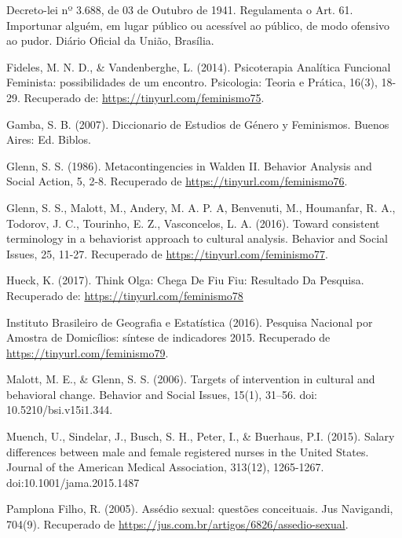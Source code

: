 \hangindent=25pt
\noindent Decreto-lei nº 3.688, de 03 de Outubro de 1941. Regulamenta o Art. 61. Importunar alguém, em lugar público ou acessível ao público, de modo ofensivo ao pudor. Diário Oficial da União, Brasília.

\hangindent=25pt
\noindent Fideles, M. N. D., \& Vandenberghe, L. (2014). Psicoterapia Analítica Funcional Feminista: possibilidades de um encontro. Psicologia: Teoria e Prática, 16(3), 18-29. Recuperado de: \url{https://tinyurl.com/feminismo75}.

\hangindent=25pt
\noindent Gamba, S. B. (2007). Diccionario de Estudios de Género y Feminismos. Buenos Aires: Ed. Biblos.

\hangindent=25pt
\noindent Glenn, S. S. (1986). Metacontingencies in Walden II. Behavior Analysis and Social Action, 5, 2-8. Recuperado de \url{https://tinyurl.com/feminismo76}.

\hangindent=25pt
\noindent Glenn, S. S., Malott, M., Andery, M. A. P. A, Benvenuti, M., Houmanfar, R. A., Todorov, J. C., Tourinho, E. Z., Vasconcelos, L. A. (2016). Toward consistent terminology in a behaviorist approach to cultural analysis. Behavior and Social Issues, 25, 11-27. Recuperado de \url{https://tinyurl.com/feminismo77}.

\hangindent=25pt
\noindent Hueck, K. (2017). Think Olga: Chega De Fiu Fiu: Resultado Da Pesquisa. Recuperado de: \url{https://tinyurl.com/feminismo78}

\hangindent=25pt
\noindent Instituto Brasileiro de Geografia e Estatística (2016). Pesquisa Nacional por Amostra de Domicílios: síntese de indicadores 2015. Recuperado de \url{https://tinyurl.com/feminismo79}.

\hangindent=25pt
\noindent Malott, M. E., \& Glenn, S. S. (2006). Targets of intervention in cultural and behavioral change. Behavior and Social Issues, 15(1), 31–56. doi: 10.5210/bsi.v15i1.344.

\hangindent=25pt
\noindent Muench, U., Sindelar, J., Busch, S. H., Peter, I., \& Buerhaus, P.I. (2015). Salary differences between male and female registered nurses in the United States. Journal of the American Medical Association, 313(12), 1265-1267. doi:10.1001/jama.2015.1487 

\hangindent=25pt
\noindent Pamplona Filho, R. (2005). Assédio sexual: questões conceituais. Jus Navigandi, 704(9). Recuperado de \url{https://jus.com.br/artigos/6826/assedio-sexual}.

